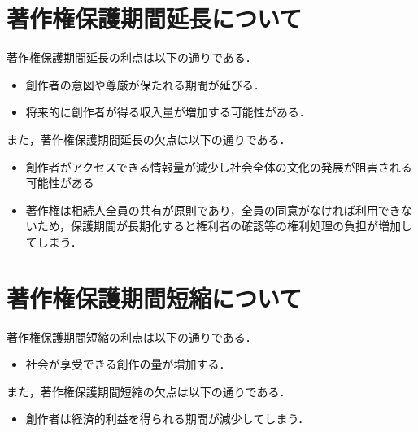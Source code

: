 \documentclass[dvipdfmx]{jarticle}
\begin{document}
\section{著作権保護期間延長について}
著作権保護期間延長の利点は以下の通りである．\cite{3}
\begin{itemize}
    \item 創作者の意図や尊厳が保たれる期間が延びる．
    \item 将来的に創作者が得る収入量が増加する可能性がある．
\end{itemize}
また，著作権保護期間延長の欠点は以下の通りである．
\begin{itemize}
    \item 創作者がアクセスできる情報量が減少し社会全体の文化の発展が阻害される可能性がある
    \item 著作権は相続人全員の共有が原則であり，全員の同意がなければ利用できないため，保護期間が長期化すると権利者の確認等の権利処理の負担が増加してしまう．
\end{itemize}
\section{著作権保護期間短縮について}
著作権保護期間短縮の利点は以下の通りである．\cite{4}
\begin{itemize}
    \item 社会が享受できる創作の量が増加する．
\end{itemize}
また，著作権保護期間短縮の欠点は以下の通りである．
\begin{itemize}
    \item 創作者は経済的利益を得られる期間が減少してしまう．
\end{itemize}
\end{document}
